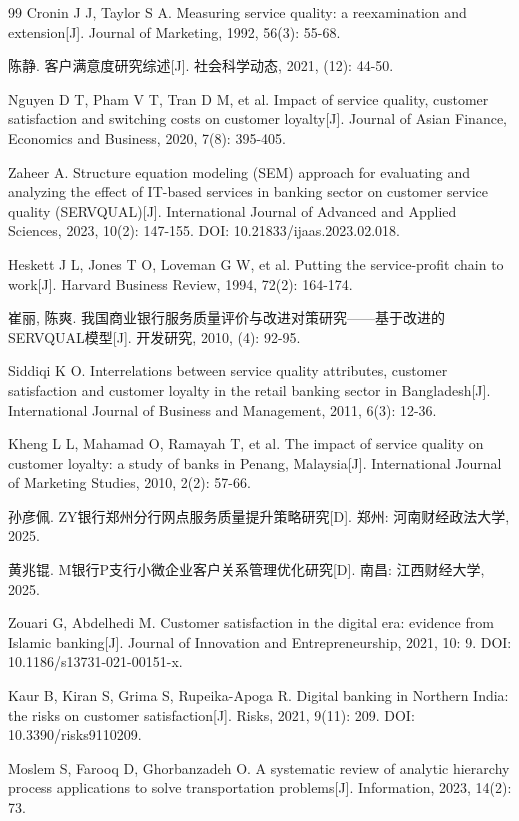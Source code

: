 \begin{thebibliography}{99}
 Cronin J J, Taylor S A. Measuring service quality: a reexamination and extension[J]. Journal of Marketing, 1992, 56(3): 55-68.

 陈静. 客户满意度研究综述[J]. 社会科学动态, 2021, (12): 44-50.

 Nguyen D T, Pham V T, Tran D M, et al. Impact of service quality, customer satisfaction and switching costs on customer loyalty[J]. Journal of Asian Finance, Economics and Business, 2020, 7(8): 395-405.

 Zaheer A. Structure equation modeling (SEM) approach for evaluating and analyzing the effect of IT-based services in banking sector on customer service quality (SERVQUAL)[J]. International Journal of Advanced and Applied Sciences, 2023, 10(2): 147-155. DOI: 10.21833/ijaas.2023.02.018.

 Heskett J L, Jones T O, Loveman G W, et al. Putting the service-profit chain to work[J]. Harvard Business Review, 1994, 72(2): 164-174.

 崔丽, 陈爽. 我国商业银行服务质量评价与改进对策研究——基于改进的SERVQUAL模型[J]. 开发研究, 2010, (4): 92-95.

 Siddiqi K O. Interrelations between service quality attributes, customer satisfaction and customer loyalty in the retail banking sector in Bangladesh[J]. International Journal of Business and Management, 2011, 6(3): 12-36.

 Kheng L L, Mahamad O, Ramayah T, et al. The impact of service quality on customer loyalty: a study of banks in Penang, Malaysia[J]. International Journal of Marketing Studies, 2010, 2(2): 57-66.

 孙彦佩. ZY银行郑州分行网点服务质量提升策略研究[D]. 郑州: 河南财经政法大学, 2025.

 黄兆锟. M银行P支行小微企业客户关系管理优化研究[D]. 南昌: 江西财经大学, 2025.

 Zouari G, Abdelhedi M. Customer satisfaction in the digital era: evidence from Islamic banking[J]. Journal of Innovation and Entrepreneurship, 2021, 10: 9. DOI: 10.1186/s13731-021-00151-x.

 Kaur B, Kiran S, Grima S, Rupeika-Apoga R. Digital banking in Northern India: the risks on customer satisfaction[J]. Risks, 2021, 9(11): 209. DOI: 10.3390/risks9110209.

 Moslem S, Farooq D, Ghorbanzadeh O. A systematic review of analytic hierarchy process applications to solve transportation problems[J]. Information, 2023, 14(2): 73.


\end{thebibliography}
